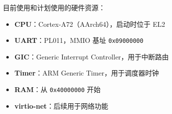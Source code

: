 
目前使用和计划使用的硬件资源：

\begin{itemize}
    \item \textbf{CPU}：Cortex-A72（AArch64），启动时位于 EL2
    \item \textbf{UART}：PL011，MMIO 基址 \texttt{0x09000000}
    \item \textbf{GIC}：Generic Interrupt Controller，用于中断路由
    \item \textbf{Timer}：ARM Generic Timer，用于调度器时钟
    \item \textbf{RAM}：从 \texttt{0x40000000} 开始
    \item \textbf{virtio-net}：后续用于网络功能
\end{itemize}
